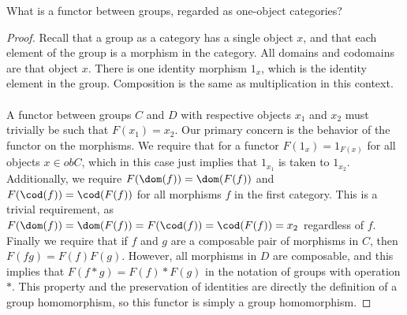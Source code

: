 \documentclass[main.tex]{subfiles}
\begin{document}
\begin{exercise}
	What is a functor between groups, regarded as one-object categories?
\end{exercise}

\begin{proof}
	Recall that a group as a category has a single object \(x\), and that each
	element of the group is a morphism in the category.  All domains and
	codomains are that object \(x\).  There is one identity morphism \(1_x\),
	which is the identity element in the group.  Composition is the same as
	multiplication in this context. \\ \\ A functor between groups \(C\) and
	\(D\) with respective objects \(x_1\) and \(x_2\) must trivially be such
	that \(F(x_1) = x_2\).  Our primary concern is the behavior of the functor
	on the morphisms. We require that for a functor \(F(1_x) = 1_{F(x)}\) for
	all objects \(x \in obC\), which in this case just implies that \(1_{x_1}\)
	is taken to \(1_{x_2}\).  Additionally, we require \(F(\dom(f)) =
	\dom(F(f))\) and \(F(\cod(f)) = \cod(F(f))\) for all morphisms \(f\) in the
	first category.  This is a trivial requirement, as \(F(\dom(f)) = \dom(F(f))
	= F(\cod(f))= \cod(F(f)) = x_2\) regardless of \(f\).  Finally we require
	that if \(f\) and \(g\) are a composable pair of morphisms in \(C\), then
	\(F(fg) = F(f)F(g)\). However, all morphisms in \(D\) are composable, and
	this implies that \(F(f*g) = F(f)*F(g)\) in the notation of groups with
	operation \(*\).  This property and the preservation of identities are
	directly the definition of a group homomorphism, so this functor is simply a
	group homomorphism.
\end{proof}
\end{document}

